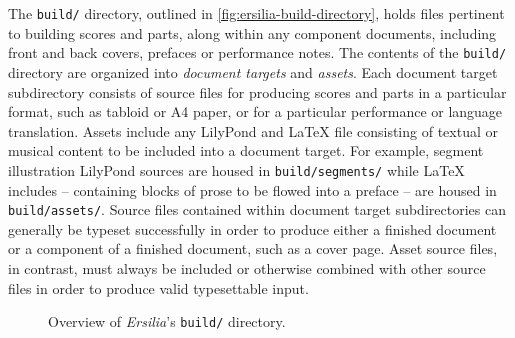 The \texttt{build/} directory, outlined in
\autoref{fig:ersilia-build-directory}, holds files pertinent to building scores
and parts, along within any component documents, including front and back
covers, prefaces or performance notes. The contents of the \texttt{build/}
directory are organized into \emph{document targets} and \emph{assets}. Each
document target subdirectory consists of source files for producing scores and
parts in a particular format, such as tabloid or A4 paper, or for a particular
performance or language translation. Assets include any LilyPond and LaTeX file
consisting of textual or musical content to be included into a document target.
For example, segment illustration LilyPond sources are housed in
\texttt{build/segments/} while LaTeX includes -- containing blocks of prose to
be flowed into a preface  -- are housed in \texttt{build/assets/}. Source files
contained within document target subdirectories can generally be typeset
successfully in order to produce either a finished document or a component of a
finished document, such as a cover page. Asset source files, in contrast, must
always be included or otherwise combined with other source files in order to
produce valid typesettable input.

\begin{figure}[h!]
\begin{singlespacing}
\vspace{-0.5\baselineskip}
\end{singlespacing}
\caption{Overview of \emph{Ersilia}'s \texttt{build/} directory.}
\label{fig:ersilia-build-directory}
\end{figure}

